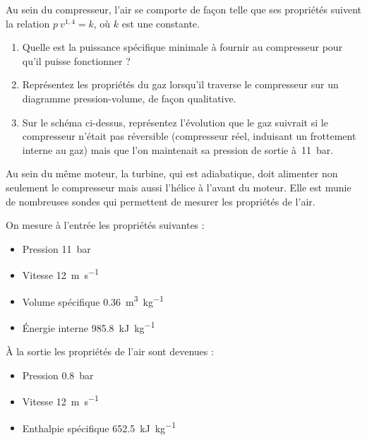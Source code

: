 	
	Au sein du compresseur, l’air se comporte de façon telle que ses propriétés suivent la relation $p \ v^{1,4} = k$, où $k$ est une constante.

	\begin{enumerate}
		\item Quelle est la puissance spécifique minimale à fournir au compresseur pour qu’il puisse fonctionner ?
		\item Représentez les propriétés du gaz lorsqu’il traverse le compresseur sur un diagramme pression-volume, de façon qualitative.
		\item Sur le schéma ci-dessus, représentez l’évolution que le gaz suivrait si le compresseur n’était pas réversible (compresseur réel, induisant un frottement interne au gaz) mais que l’on maintenait sa pression de sortie à~\SI{11}{\bar}.
	\end{enumerate}
	
	Au sein du même moteur, la turbine, qui est adiabatique, doit alimenter non seulement le compresseur mais aussi l’hélice à l’avant du moteur. Elle est munie de nombreuses sondes qui permettent de mesurer les propriétés de l’air.
	
	On mesure à l’entrée les propriétés suivantes :
	\begin{itemize}
		\item Pression 		\tab \SI{11}{\bar}
		\item Vitesse 		\tab \SI{12}{\metre\per\second}
		\item Volume spécifique 		\tab \SI{0,36}{\metre\cubed\per\kilogram}
		\item Énergie interne 		\tab \SI{985,8}{\kilo\joule\per\kilogram}
	\end{itemize}
	
	À la sortie les propriétés de l’air sont devenues :	
	\begin{itemize}
		\item Pression 		\tab \SI{0,8}{\bar}
		\item Vitesse 		\tab \SI{12}{\metre\per\second}
		\item Enthalpie spécifique 		\tab \SI{652,5}{\kilo\joule\per\kilogram}
	\end{itemize}

